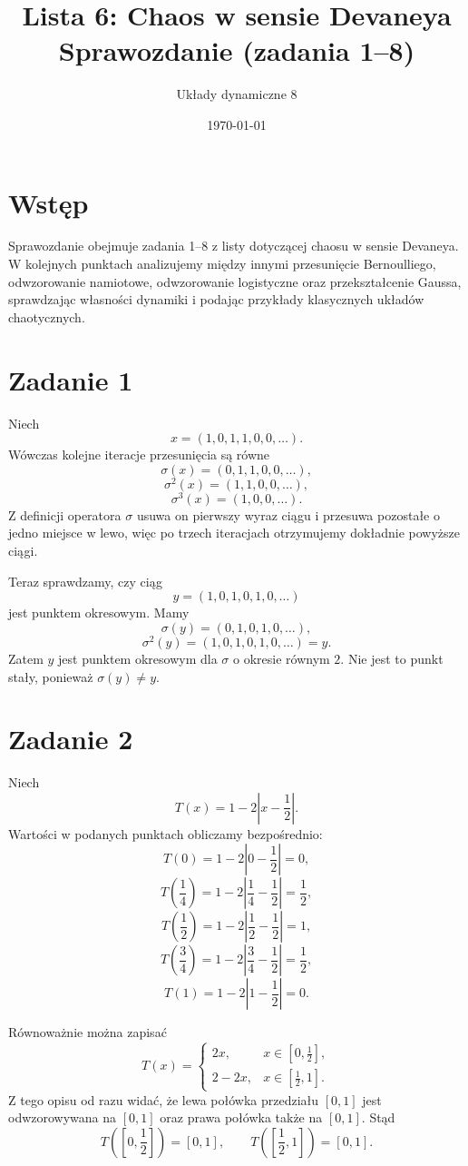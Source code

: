 \documentclass[11pt,a4paper]{article}
\title{Lista 6: Chaos w sensie Devaneya\\Sprawozdanie (zadania 1--8)}
\author{Układy dynamiczne 8}
\date{\today}
\theoremstyle{plain}
\theoremstyle{definition}
\begin{document}
\maketitle
\tableofcontents

\section{Wstęp}

Sprawozdanie obejmuje zadania 1--8 z listy dotyczącej chaosu w sensie Devaneya.
W kolejnych punktach analizujemy między innymi przesunięcie Bernoulliego,
odwzorowanie namiotowe, odwzorowanie logistyczne oraz przekształcenie Gaussa,
sprawdzając własności dynamiki i podając przykłady klasycznych układów chaotycznych.

\section{Zadanie 1}

Niech
\[
x = (1,0,1,1,0,0,\dots).
\]
Wówczas kolejne iteracje przesunięcia są równe
\[
\sigma(x) = (0,1,1,0,0,\dots),
\]
\[
\sigma^2(x) = (1,1,0,0,\dots),
\]
\[
\sigma^3(x) = (1,0,0,\dots).
\]
Z definicji operatora $\sigma$ usuwa on pierwszy wyraz ciągu i przesuwa pozostałe o jedno miejsce w lewo, więc po trzech iteracjach otrzymujemy dokładnie powyższe ciągi.

Teraz sprawdzamy, czy ciąg
\[
y = (1,0,1,0,1,0,\dots)
\]
jest punktem okresowym. Mamy
\[
\sigma(y) = (0,1,0,1,0,\dots),
\]
\[
\sigma^2(y) = (1,0,1,0,1,0,\dots) = y.
\]
Zatem $y$ jest punktem okresowym dla $\sigma$ o okresie równym $2$. Nie jest to punkt stały, ponieważ $\sigma(y) \neq y$.

\section{Zadanie 2}

Niech
\[
T(x) = 1 - 2\left|x - \frac{1}{2}\right|.
\]
Wartości w podanych punktach obliczamy bezpośrednio:
\[
T(0) = 1 - 2\left|0 - \frac{1}{2}\right| = 0,
\]
\[
T\left(\frac{1}{4}\right) = 1 - 2\left|\frac{1}{4} - \frac{1}{2}\right| = \frac{1}{2},
\]
\[
T\left(\frac{1}{2}\right) = 1 - 2\left|\frac{1}{2} - \frac{1}{2}\right| = 1,
\]
\[
T\left(\frac{3}{4}\right) = 1 - 2\left|\frac{3}{4} - \frac{1}{2}\right| = \frac{1}{2},
\]
\[
T(1) = 1 - 2\left|1 - \frac{1}{2}\right| = 0.
\]

Równoważnie można zapisać
\[
T(x) =
\begin{cases}
2x, & x \in \left[0, \frac{1}{2}\right], \\
2 - 2x, & x \in \left[\frac{1}{2}, 1\right].
\end{cases}
\]
Z tego opisu od razu widać, że lewa połówka przedziału $[0,1]$ jest odwzorowywana na $[0,1]$ oraz prawa połówka także na $[0,1]$. Stąd
\[
T\left(\left[0, \frac{1}{2}\right]\right) = [0,1],
\qquad
T\left(\left[\frac{1}{2}, 1\right]\right) = [0,1].
\]
\end{document}

